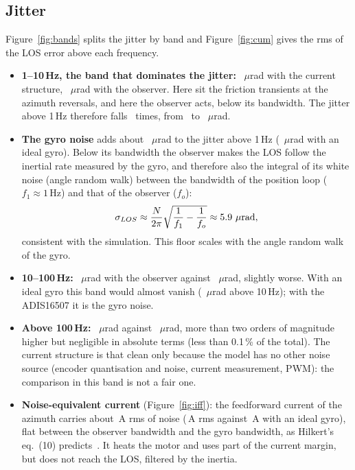 \documentclass[10pt,a4paper]{article}
\numberwithin{equation}{section}
\begin{document}
\subsection{Jitter}
Figure~\ref{fig:bands} splits the jitter by band and Figure~\ref{fig:cum} gives the rms of the LOS error above each frequency.
\begin{itemize}
\item \textbf{1--10\,Hz, the band that dominates the jitter:} \BandOneTenCur\ $\mu$rad with the current structure, \BandOneTenDob\ $\mu$rad with the observer. Here sit the friction transients at the azimuth reversals, and here the observer acts, below its bandwidth. The jitter above 1\,Hz therefore falls \JoneRatio\ times, from \JoneCur\ to \JoneDob\ $\mu$rad.
\item \textbf{The gyro noise} adds about \NoiseJone\ $\mu$rad to the jitter above 1\,Hz (\JoneIdeal\ $\mu$rad with an ideal gyro). Below its bandwidth the observer makes the LOS follow the inertial rate measured by the gyro, and therefore also the integral of its white noise (angle random walk) between the bandwidth of the position loop ($f_1\approx1$\,Hz) and that of the observer ($f_o$):
\begin{equation}
\sigma_{LOS}\approx\frac{N}{2\pi}\sqrt{\frac1{f_1}-\frac1{f_o}}\approx\noiseFloor\ \mu\text{rad},
\end{equation}
consistent with the simulation. This floor scales with the angle random walk of the gyro.
\item \textbf{10--100\,Hz:} \BandTenHunDob\ $\mu$rad with the observer against \BandTenHunCur\ $\mu$rad, slightly worse. With an ideal gyro this band would almost vanish (\JtenIdeal\ $\mu$rad above 10\,Hz); with the ADIS16507 it is the gyro noise.
\item \textbf{Above 100\,Hz:} \JhunDob\ $\mu$rad against \JhunCur\ $\mu$rad, more than two orders of magnitude higher but negligible in absolute terms (less than 0.1\,\% of the total). The current structure is that clean only because the model has no other noise source (encoder quantisation and noise, current measurement, PWM): the comparison in this band is not a fair one.
\item \textbf{Noise-equivalent current} (Figure~\ref{fig:iff}): the feedforward current of the azimuth carries about \IffNoise\,A rms of noise (\IffAz\,A rms against \IffAzIdeal\,A with an ideal gyro), flat between the observer bandwidth and the gyro bandwidth, as Hilkert's eq.~(10) predicts~\cite{hilkert2011}. It heats the motor and uses part of the current margin, but does not reach the LOS, filtered by the inertia.
\end{itemize}
\end{document}
